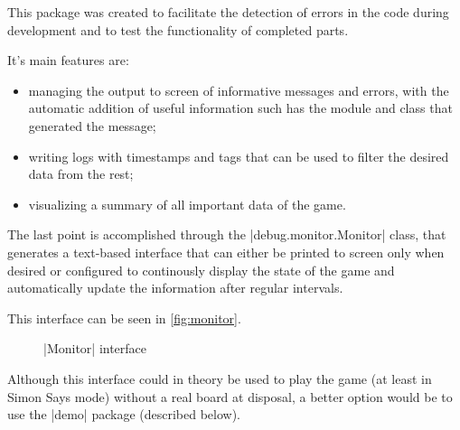 This package was created to facilitate the detection of errors in the code
during development and to test the functionality of completed parts.

\beforelist It's main features are:
\begin{itemize}
  \item managing the output to screen of informative messages and errors, with
    the automatic addition of useful information such has the module and class
    that generated the message;
  \item writing logs with timestamps and tags that can be used to filter the
    desired data from the rest;
  \item visualizing a summary of all important data of the game.
\end{itemize}
\afterlist*
The last point is accomplished through the \Code|debug.monitor.Monitor| class,
that generates a text-based interface that can either be printed to screen only
when desired or configured to continously display the state of the game and
automatically update the information after regular intervals.

This interface can be seen in \autoref{fig:monitor}.

\begin{figure}[h]
  

  \caption[ interface]{\Code|Monitor| interface}
  \label{fig:monitor}
\end{figure}

Although this interface could in theory be used to play the game (at least in
Simon Says mode) without a real board at disposal, a better option would be to
use the \Code|demo| package (described below).
